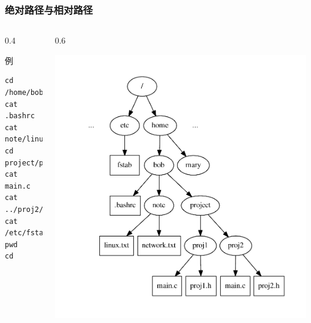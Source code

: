 \documentclass[xcolor=svgnames,presentation]{beamer}
\begin{document}
\begin{frame}[fragile]
\frametitle{绝对路径与相对路径}
\label{sec-4-2-16}
\begin{columns}
\begin{column}{0.4\textwidth}
\begin{exampleblock}{例}
\label{sec-4-2-16-1}


\begin{verbatim}
cd /home/bob
cat .bashrc
cat note/linux.txt
cd project/proj1
cat main.c
cat ../proj2/proj2.h
cat /etc/fstab
pwd
cd
\end{verbatim}
\end{exampleblock}
\end{column}
\begin{column}{0.6\textwidth}
\label{sec-4-2-16-2}

\includegraphics[width=.9\linewidth]{img/dirtree2.pdf}
\end{column}
\end{columns}
\end{frame}
\end{document}
